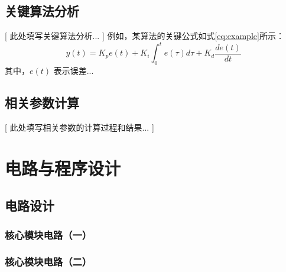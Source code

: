 \documentclass[UTF8,zihao=-4]{ctexart}
\begin{document}
\subsection{关键算法分析}
    [ 此处填写关键算法分析... ]
    例如，某算法的关键公式如式\ref{eq:example}所示：
    \begin{equation} \label{eq:example}
        y(t) = K_p e(t) + K_i \int_0^t e(\tau)d\tau + K_d \frac{de(t)}{dt}
    \end{equation}
    其中，$e(t)$ 表示误差... %

\subsection{相关参数计算}
    [ 此处填写相关参数的计算过程和结果... ]
    
\section{电路与程序设计}
\subsection{电路设计}
\subsubsection{核心模块电路（一）}
    
\subsubsection{核心模块电路（二）}
\end{document}
